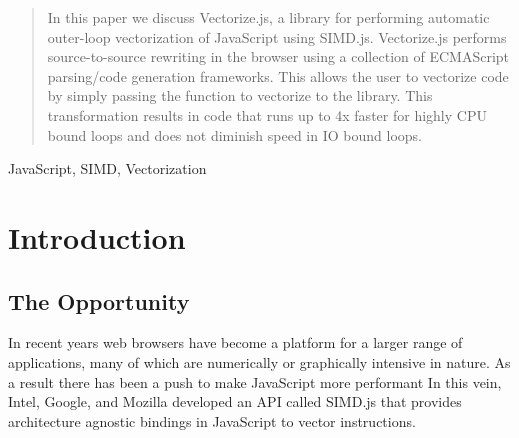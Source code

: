 \documentclass[conference]{IEEEtran}
\begin{document}
\begin{abstract}
In this paper we discuss Vectorize.js, a library for performing automatic
outer-loop vectorization of JavaScript using SIMD.js. Vectorize.js performs
source-to-source rewriting in the browser using a collection of ECMAScript parsing/code
generation frameworks. This allows the user to vectorize code by simply
passing the function to vectorize to the library. This transformation results
in code that runs up to 4x faster for highly CPU bound loops and does
not diminish speed in IO bound loops.
\end{abstract}

\begin{IEEEkeywords}
  JavaScript, SIMD, Vectorization
\end{IEEEkeywords}


%
\IEEEpeerreviewmaketitle

\section{Introduction}

\subsection{The Opportunity}
  In recent years web browsers have become a platform for a larger range of
  applications, many of which are numerically or graphically intensive in
  nature. As a result there has been a push to make JavaScript more performant
  In this vein, Intel, Google, and Mozilla developed an API called SIMD.js
  \cite{simdjs} that provides architecture agnostic bindings in JavaScript to
  vector instructions.
\end{document}
